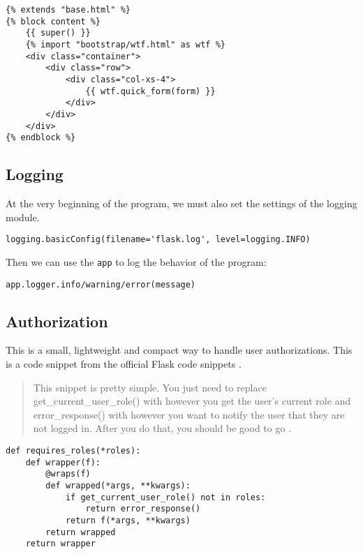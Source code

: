 \documentclass[../main/main.tex]{subfiles}
\begin{document}
\begin{lstlisting}
{% extends "base.html" %}
{% block content %}
    {{ super() }}
    {% import "bootstrap/wtf.html" as wtf %}
    <div class="container">
        <div class="row">
            <div class="col-xs-4">
                {{ wtf.quick_form(form) }}
            </div>
        </div>
    </div>
{% endblock %}
\end{lstlisting}

\subsection{Logging}

At the very beginning of the program, we must also set the settings of the
logging module.

\begin{lstlisting}
logging.basicConfig(filename='flask.log', level=logging.INFO)
\end{lstlisting}

Then we can use the \lstinline|app| to log the behavior of the program:

\begin{lstlisting}
app.logger.info/warning/error(message)
\end{lstlisting}

\subsection{Authorization}

This is a small, lightweight and compact way to handle user authorizations. This
is a code snippet from the official Flask code snippets \cite{flask:auth}.

\begin{quote} This snippet is pretty simple. You just need to replace
  get_current_user_role() with however you get the user's current role and
  error_response() with however you want to notify the user that they are not
  logged in. After you do that, you should be good to go \cite{flask:auth}.
\end{quote}

\begin{lstlisting}
def requires_roles(*roles):
    def wrapper(f):
        @wraps(f)
        def wrapped(*args, **kwargs):
            if get_current_user_role() not in roles:
                return error_response()
            return f(*args, **kwargs)
        return wrapped
    return wrapper
\end{lstlisting}
\end{document}
